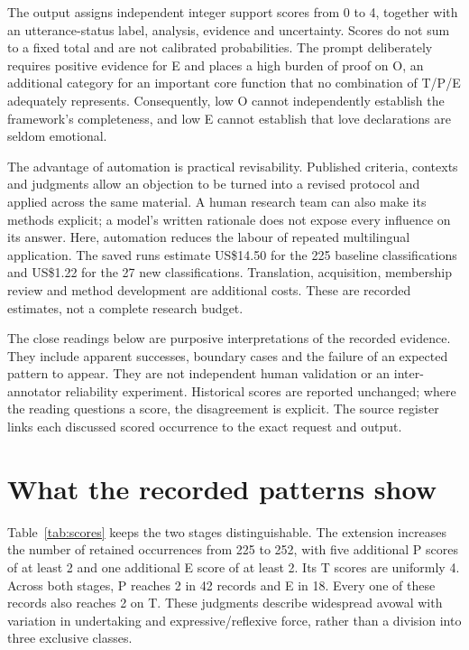 \documentclass[11pt,a4paper]{article}
\begin{document}
The output assigns independent integer support scores from 0 to 4, together with an utterance-status label, analysis, evidence and uncertainty. Scores do not sum to a fixed total and are not calibrated probabilities. The prompt deliberately requires positive evidence for E and places a high burden of proof on O, an additional category for an important core function that no combination of T/P/E adequately represents. Consequently, low O cannot independently establish the framework's completeness, and low E cannot establish that love declarations are seldom emotional.

The advantage of automation is practical revisability. Published criteria, contexts and judgments allow an objection to be turned into a revised protocol and applied across the same material. A human research team can also make its methods explicit; a model's written rationale does not expose every influence on its answer. Here, automation reduces the labour of repeated multilingual application. The saved runs estimate US\$14.50 for the 225 baseline classifications and US\$1.22 for the 27 new classifications. Translation, acquisition, membership review and method development are additional costs. These are recorded estimates, not a complete research budget.

The close readings below are purposive interpretations of the recorded evidence. They include apparent successes, boundary cases and the failure of an expected pattern to appear. They are not independent human validation or an inter-annotator reliability experiment. Historical scores are reported unchanged; where the reading questions a score, the disagreement is explicit. The source register links each discussed scored occurrence to the exact request and output.

\section{What the recorded patterns show}




Table~\ref{tab:scores} keeps the two stages distinguishable. The extension increases the number of retained occurrences from 225 to 252, with five additional P scores of at least 2 and one additional E score of at least 2. Its T scores are uniformly 4. Across both stages, P reaches 2 in 42 records and E in 18. Every one of these records also reaches 2 on T. These judgments describe widespread avowal with variation in undertaking and expressive/reflexive force, rather than a division into three exclusive classes.
\end{document}
